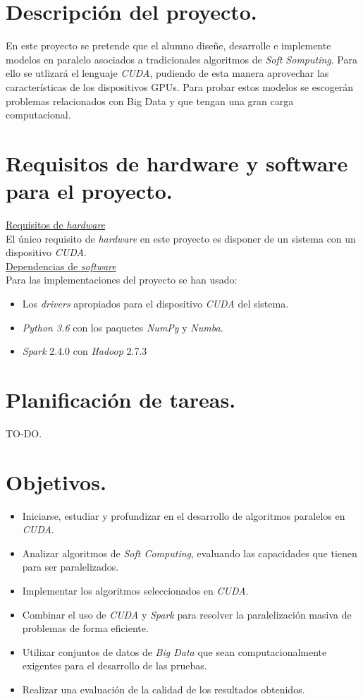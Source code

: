 \documentclass[a4paper,oneside,11pt,titlepage]{book}
\begin{document}
\section{Descripción del proyecto.}
En este proyecto se pretende que el alumno diseñe, desarrolle e implemente modelos en paralelo asociados a tradicionales algoritmos de \textit{Soft Somputing}. Para ello se utlizará el lenguaje \textit{CUDA}, pudiendo de esta manera aprovechar las características de los dispositivos GPUs. Para probar estos modelos se escogerán problemas relacionados con Big Data y que tengan una gran carga computacional.

\section{Requisitos de hardware y software para el proyecto.}
\underline{Requisitos de \textit{hardware}}\\
El único requisito de \textit{hardware} en este proyecto es disponer de un sistema con un dispositivo \textit{CUDA}. \\

\underline{Dependencias de \textit{software}}\\
Para las implementaciones del proyecto se han usado:
\begin{itemize}
  \item Los \textit{drivers} apropiados para el dispositivo \textit{CUDA} del sistema.
  \item \textit{Python 3.6} con los paquetes \textit{NumPy} y \textit{Numba}.
  \item \textit{Spark} 2.4.0 con \textit{Hadoop} 2.7.3
\end{itemize}

\section{Planificación de tareas.}
TO-DO.
\section{Objetivos.}
\begin{itemize}
    \item Iniciarse, estudiar y profundizar en el desarrollo de algoritmos paralelos en \textit{CUDA}.
    \item Analizar algoritmos de \textit{Soft Computing}, evaluando las capacidades que tienen para ser paralelizados.
    \item Implementar los algoritmos seleccionados en \textit{CUDA}.
    \item Combinar el uso de \textit{CUDA} y \textit{Spark} para resolver la paralelización masiva de problemas de forma eficiente.
    \item Utilizar conjuntos de datos de \textit{Big Data} que sean computacionalmente exigentes para el desarrollo de las pruebas.
    \item Realizar una evaluación de la calidad de los resultados obtenidos.
\end{itemize}
\end{document}
